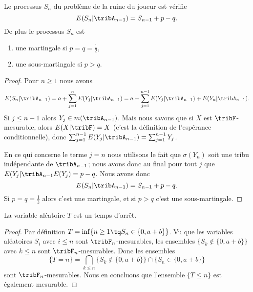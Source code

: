\begin{lemma}   \label{LemEOAmVyZ}
	Le processus \( S_n\) du problème de la ruine du joueur est vérifie
	\begin{equation}    \label{EqZQtwVMXyiB}
		E(S_n|\tribA_{n-1})=S_{n-1}+p-q.
	\end{equation}
	De plus le processus \( S_n\) est
	\begin{enumerate}
		\item
		      une martingale si \( p=q=\frac{ 1 }{2}\),
		\item
		      une sous-martingale si \( p>q\).
	\end{enumerate}
\end{lemma}

\begin{proof}
	Pour \( n\geq 1 \) nous avons
	\begin{equation}
		E(S_n|\tribA_{n-1})=a+\sum_{j=1}^nE(Y_j|\tribA_{n-1})=a+\sum_{j=1}^{n-1}E(Y_j|\tribA_{n-1})+E(Y_n|\tribA_{n-1}).
	\end{equation}
	Si \( j\leq n-1\) alors \( Y_j\in m(\tribA_{n-1})\). Mais nous savons que si \( X\) est \( \tribF\)-mesurable, alors \( E(X|\tribF)=X\) (c'est la définition de l'espérance conditionnelle), donc \( \sum_{j=1}^{n-1}E(Y_j|\tribA_{n-1})=\sum_{j=1}^{n-1}Y_j\).

	En ce qui concerne le terme \( j=n\) nous utilisons le fait que \( \sigma(Y_n)\) soit une tribu indépendante de \( \tribA_{n-1}\); nous avons donc au final pour tout \( j\) que \( E(Y_j|\tribA_{n-1}E(Y_j)=p-q\). Nous avons donc
	\begin{equation}
		E(S_n|\tribA_{n-1})=S_{n-1}+p-q.
	\end{equation}
	Si \( p=q=\frac{ 1 }{2}\) alors c'est une martingale, et si \( p>q\) c'est une sous-martingale.
\end{proof}

\begin{lemma}   \label{LemXDlNxtE}
	La variable aléatoire \( T\) est un temps d'arrêt.
\end{lemma}

\begin{proof}
	Par définition \( T=\inf\{ n\geq 1\tq S_n\in\{ 0,a+b \} \}\). Vu que les variables aléatoires \( S_i\) avec \( i\leq n\) sont \( \tribF_n\)-mesurables, les ensembles \( \big\{ S_k\notin\{ 0,a+b \} \big\}\) avec \( k\leq n\) sont \( \tribF_n\)-mesurables. Donc les ensembles
	\begin{equation}
		\{ T=n \}=\bigcap_{k\leq n}\big\{ S_k\notin\{ 0,a+b \} \big\}\cap\big\{ S_n\in\{ 0,a+b \} \big\}
	\end{equation}
	sont \( \tribF_n\)-mesurables. Nous en concluons que l'ensemble \( \{ T\leq n \}\) est également mesurable.
\end{proof}

